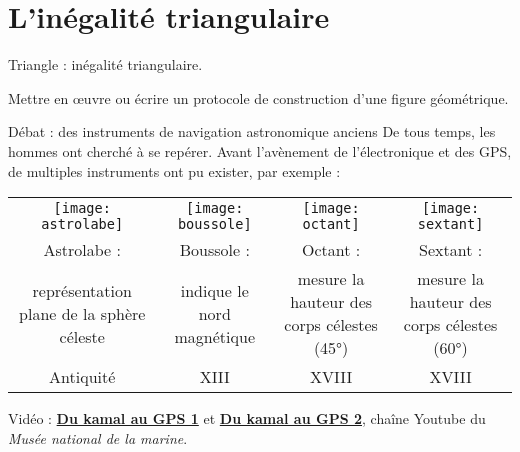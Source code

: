 \graphicspath{{../../S17_Inegalite_triangulaire/Images/}}

\themeG
\chapter{L'inégalité triangulaire}
\label{S17}

\programme%
   {\item Triangle : inégalité triangulaire.}
   {\item Mettre en \oe uvre ou écrire un protocole de construction d’une figure géométrique.}

\vfill

\begin{debat}{Débat :  des instruments de navigation astronomique anciens}
   De tous temps, les hommes ont cherché à se repérer. Avant l’avènement de l'électronique et des GPS, de multiples instruments ont pu exister, par exemple : 
   \tcblower
      \begin{tabular}{*{4}{C{3.6}}}
         \texttt{[image: astrolabe]} & \texttt{[image: boussole]}  & \texttt{[image: octant]} & \texttt{[image: sextant]} \\
         Astrolabe : & Boussole : & Octant : & Sextant : \\
         représentation plane de la sphère céleste & indique le nord magnétique & mesure la hauteur des corps célestes (45°) & mesure la hauteur des corps célestes (60°) \\
         Antiquité & {\small XIII} & {\small XVIII} & {\small XVIII} \\
   \end{tabular}
\end{debat}

\hfill {\gray Vidéo : \href{https://www.youtube.com/watch?v=E0KvuFx0Mr8}{\bf Du kamal au GPS 1} et \href{https://www.youtube.com/watch?v=Jv21tvyZokk}{\bf Du kamal au GPS 2}, chaîne Youtube du {\it Musée national de la marine}.}



